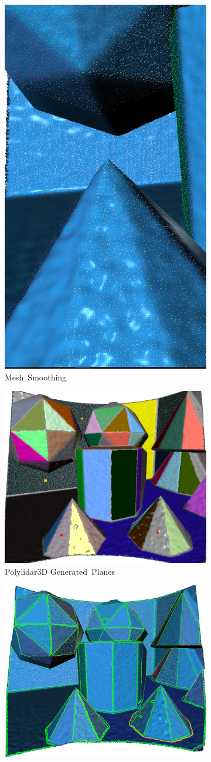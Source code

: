 \begin{figure}[H]
\begin{subfigure}[t]{.23\linewidth}
    \centering\includegraphics[width=.5\linewidth]{chapter_3_polylidar3d/imgs/synpeb_var4_mesh_smooth_cropped.png}
    \caption{\label{fig:ch3_synpeb_c}Mesh~Smoothing}
  \end{subfigure}
  \par\bigskip
    \centering
  \begin{subfigure}[t]{.45\linewidth}
    \centering\includegraphics[width=.5\linewidth]{chapter_3_polylidar3d/imgs/synpeb_var4_planes_cropped_change.png}
    \caption{\label{fig:ch3_synpeb_d}Polylidar3D Generated~Planes}
  \end{subfigure}
  \hspace{1cm}
  \begin{subfigure}[t]{.45\linewidth}
    \centering\includegraphics[width=.5\linewidth]{chapter_3_polylidar3d/imgs/synpeb_var4_polygons_raw.png}

\end{subfigure}
\end{figure}
